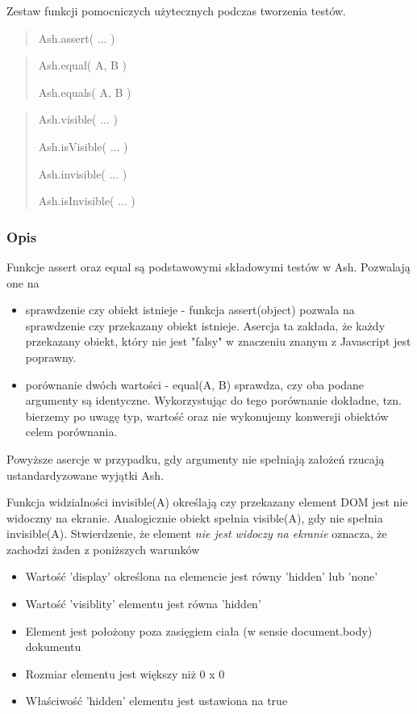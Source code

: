\documentclass[brudnopis]{xmgr}
\begin{document}
Zestaw funkcji pomocniczych użytecznych podczas tworzenia testów.

\begin{quote}
Ash.assert( ... ) 
\end{quote}

\begin{quote}
Ash.equal( A, B )

Ash.equals( A, B ) 
\end{quote}

\begin{quote}
Ash.visible( ... ) 

Ash.isVisible( ... )

Ash.invisible( ... )

Ash.isInvisible( ... )
\end{quote}

\subsubsection{Opis}

Funkcje assert oraz equal są podstawowymi składowymi testów w Ash. Pozwalają one na 

\begin{itemize}
  \item sprawdzenie czy obiekt istnieje - funkcja assert(object) pozwala na sprawdzenie czy przekazany obiekt istnieje. Asercja ta zakłada, że każdy przekazany obiekt, który nie jest "falsy" w znaczeniu znanym z Javascript jest poprawny. 
  \item porównanie dwóch wartości - equal(A, B) sprawdza, czy oba podane argumenty są identyczne. Wykorzystując do tego porównanie dokładne, tzn. bierzemy po uwagę typ, wartość oraz nie wykonujemy konwersji obiektów celem porównania.
\end{itemize}
Powyższe asercje w przypadku, gdy argumenty nie spełniają założeń rzucają ustandardyzowane wyjątki Ash. 

Funkcja widzialności invisible(A) określają czy przekazany element DOM jest nie widoczny na ekranie. Analogicznie obiekt spełnia visible(A), gdy nie spełnia invisible(A). Stwierdzenie, że element {\it nie jest widoczy na ekranie} oznacza, że zachodzi żaden z poniższych warunków

\begin{itemize}
  \item Wartość 'display' określona na elemencie jest równy 'hidden' lub 'none'
  \item Wartość 'visiblity' elementu jest równa 'hidden'
  \item Element jest położony poza zasięgiem ciała (w sensie document.body) dokumentu
  \item Rozmiar elementu jest większy niż 0 x 0
  \item Właściwość 'hidden' elementu jest ustawiona na true
\end{itemize}
\end{document}
